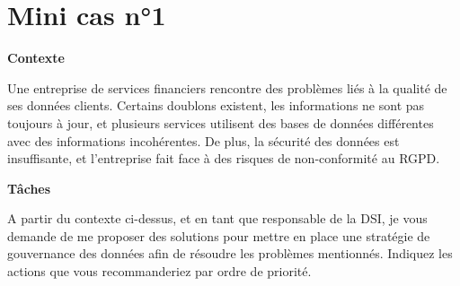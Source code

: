 \section*{Mini cas n°1}

\textbf{Contexte}

Une entreprise de services financiers rencontre des problèmes liés à la qualité de ses données clients. Certains doublons existent, les informations ne sont pas toujours à jour, et plusieurs services utilisent des bases de données différentes avec des informations incohérentes. De plus, la sécurité des données est insuffisante, et l’entreprise fait face à des risques de non-conformité au RGPD.

\textbf{Tâches}

A partir du contexte ci-dessus, et en tant que responsable de la DSI, je vous demande de me proposer des solutions pour mettre en place une stratégie de gouvernance des données afin de résoudre les problèmes mentionnés. Indiquez les actions que vous recommanderiez par ordre de priorité.

